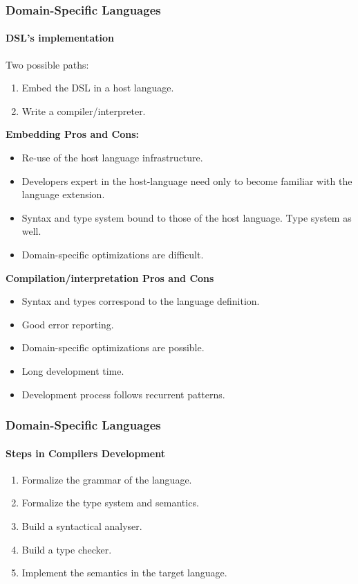 \documentclass[10pt,a4paper]{beamer}
\begin{document}
\begin{frame}
\frametitle{Domain-Specific Languages}
\framesubtitle{DSL's implementation}

Two possible paths:

\begin{enumerate}
	\item Embed the DSL in a host language.
	\item Write a compiler/interpreter.
\end{enumerate}

\textbf{Embedding Pros and Cons:}

\begin{itemize}
	\item Re-use of the host language infrastructure.
	\item Developers expert in the host-language need only to become familiar with the language extension.
	\item Syntax and type system bound to those of the host language. Type system as well.
	\item Domain-specific optimizations are difficult.
\end{itemize}

\textbf{Compilation/interpretation Pros and Cons}

\begin{itemize}
	\item Syntax and types correspond to the language definition.
	\item Good error reporting.
	\item Domain-specific optimizations are possible.
	\item Long development time.
	\item Development process follows recurrent patterns.
\end{itemize}
\end{frame}

\begin{frame}
\frametitle{Domain-Specific Languages}
\framesubtitle{Steps in Compilers Development}
\begin{enumerate}
	\item Formalize the grammar of the language.
	\item Formalize the type system and semantics.
	\item Build a syntactical analyser.
	\item Build a type checker.
	\item Implement the semantics in the target language.
\end{enumerate}
\end{frame}
\end{document}
